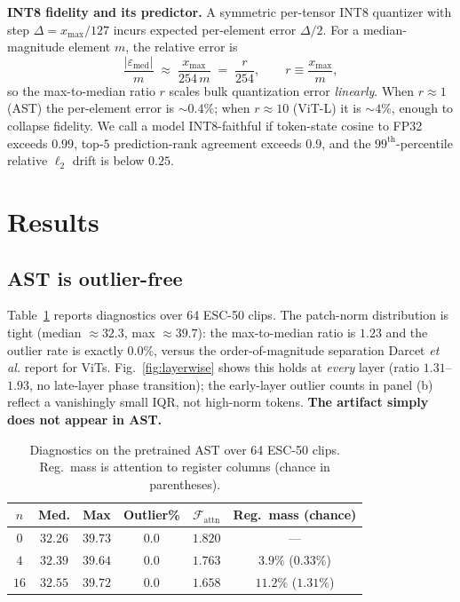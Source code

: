 \documentclass{article}
\begin{document}
\textbf{INT8 fidelity and its predictor.} A symmetric per-tensor INT8 quantizer with step $\Delta = x_{\max}/127$ incurs expected per-element error $\Delta/2$. For a median-magnitude element $m$, the relative error is
\begin{equation}
\frac{|\varepsilon_{\text{med}}|}{m}\;\approx\;\frac{x_{\max}}{254\,m}\;=\;\frac{r}{254},
\qquad r \equiv \frac{x_{\max}}{m},
\label{eq:r}
\end{equation}
so the max-to-median ratio $r$ scales bulk quantization error \emph{linearly}. When $r\!\approx\!1$ (AST) the per-element error is $\sim\!0.4\%$; when $r\!\approx\!10$ (ViT-L) it is $\sim\!4\%$, enough to collapse fidelity. We call a model INT8-faithful if token-state cosine to FP32 exceeds $0.99$, top-$5$ prediction-rank agreement exceeds $0.9$, and the $99^{\text{th}}$-percentile relative $\ell_2$ drift is below $0.25$.

\section{Results}
\subsection{AST is outlier-free}
Table~\ref{tab:diag} reports diagnostics over 64 ESC-50 clips. The patch-norm distribution is tight (median $\approx 32.3$, max $\approx 39.7$): the max-to-median ratio is $1.23$ and the outlier rate is exactly $0.0\%$, versus the order-of-magnitude separation Darcet \emph{et al.} report for ViTs. Fig.~\ref{fig:layerwise} shows this holds at \emph{every} layer (ratio $1.31$--$1.93$, no late-layer phase transition); the early-layer outlier counts in panel (b) reflect a vanishingly small IQR, not high-norm tokens. \textbf{The artifact simply does not appear in AST.}

\begin{table}[t]
\caption{Diagnostics on the pretrained AST over 64 ESC-50 clips. Reg.\ mass is attention to register columns (chance in parentheses).}
\label{tab:diag}
\centering\renewcommand{\arraystretch}{1.12}\setlength{\tabcolsep}{4pt}
\begin{tabular}{cccccc}
\toprule
$n$ & Med. & Max & Outlier\% & $\mathcal{F}_{\text{attn}}$ & Reg.\ mass (chance)\\
\midrule
$0$ & $32.26$ & $39.73$ & $0.0$ & $1.820$ & ---\\
$4$ & $32.39$ & $39.64$ & $0.0$ & $1.763$ & $3.9\%$ ($0.33\%$)\\
$16$ & $32.55$ & $39.72$ & $0.0$ & $1.658$ & $11.2\%$ ($1.31\%$)\\
\bottomrule
\end{tabular}
\end{table}
\end{document}
